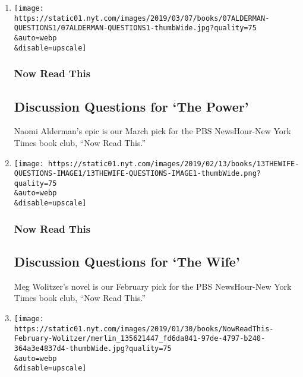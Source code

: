 \begin{enumerate}
\def\labelenumi{\arabic{enumi}.}
\item
  \href{/2019/03/07/books/discussion-questions-for-the-power-by-naomi-alderman.html}{}

  \texttt{[image: https://static01.nyt.com/images/2019/03/07/books/07ALDERMAN-QUESTIONS1/07ALDERMAN-QUESTIONS1-thumbWide.jpg?quality=75\\\&auto=webp\\\&disable=upscale]}

  \hypertarget{now-read-this-2}{%
  \subsubsection{Now Read This}\label{now-read-this-2}}

  \hypertarget{discussion-questions-for-the-power}{%
  \subsection{Discussion Questions for `The
  Power'}\label{discussion-questions-for-the-power}}

  Naomi Alderman's epic is our March pick for the PBS NewsHour-New York
  Times book club, ``Now Read This.''
\item
  \href{/2019/02/13/books/discussion-questions-for-the-wife.html}{}

  \texttt{[image: https://static01.nyt.com/images/2019/02/13/books/13THEWIFE-QUESTIONS-IMAGE1/13THEWIFE-QUESTIONS-IMAGE1-thumbWide.png?quality=75\\\&auto=webp\\\&disable=upscale]}

  \hypertarget{now-read-this-3}{%
  \subsubsection{Now Read This}\label{now-read-this-3}}

  \hypertarget{discussion-questions-for-the-wife}{%
  \subsection{Discussion Questions for `The
  Wife'}\label{discussion-questions-for-the-wife}}

  Meg Wolitzer's novel is our February pick for the PBS NewsHour-New
  York Times book club, ``Now Read This.''
\item
  \href{/2019/01/30/books/februarys-book-club-pick-the-wife-by-meg-wolitzer.html}{}

  \texttt{[image: https://static01.nyt.com/images/2019/01/30/books/NowReadThis-February-Wolitzer/merlin\_135621447\_fd6da841-97de-4797-b240-364a3e4837d4-thumbWide.jpg?quality=75\\\&auto=webp\\\&disable=upscale]}


\end{enumerate}
